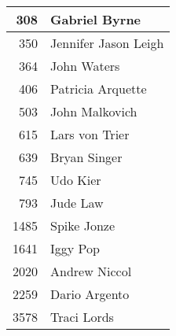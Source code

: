 \documentclass[dvipsnames]{beamer}
\theoremstyle{plain}
\begin{document}
\begin{frame}
\begin{example}
\begin{columns}[b]
      \begin{tiny}
      \begin{table}
        \begin{tabular}{|r|l|}\hline
 308 & Gabriel Byrne       \\\hline
 350 & Jennifer Jason Leigh\\\hline
 364 & John Waters         \\\hline
 406 & Patricia Arquette   \\\hline
 503 & John Malkovich      \\\hline
 615 & Lars von Trier      \\\hline
 639 & Bryan Singer        \\\hline
 745 & Udo Kier            \\\hline
 793 & Jude Law            \\\hline
1485 & Spike Jonze         \\\hline
1641 & Iggy Pop            \\\hline
2020 & Andrew Niccol       \\\hline
2259 & Dario Argento       \\\hline
3578 & Traci Lords         \\\hline
        \end{tabular}
      \end{table}
      \end{tiny}
  \end{columns}
  \end{example}
\end{frame}
\end{document}
